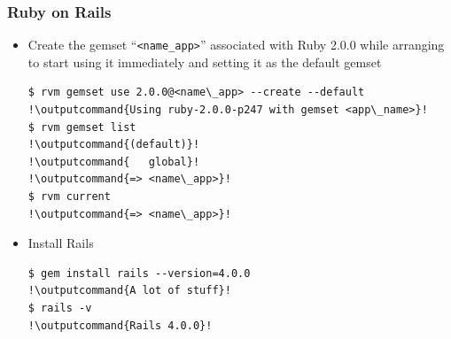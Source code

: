 \documentclass{beamer}
\newcommand{\outputcommand}[1]{\color{darkgreen}{#1}}
\begin{document}
\begin{frame}[fragile]
\frametitle{Ruby on Rails}
\begin{itemize}
\item Create the gemset ``\texttt{<name\_app>}'' associated with Ruby 2.0.0 while arranging to start using it immediately and setting it as the default gemset
\lstset{language=shell, escapechar=!}
\begin{lstlisting}[escapechar=!]
$ rvm gemset use 2.0.0@<name\_app> --create --default
!\outputcommand{Using ruby-2.0.0-p247 with gemset <app\_name>}!
$ rvm gemset list
!\outputcommand{(default)}!
!\outputcommand{   global}!
!\outputcommand{=> <name\_app>}!
$ rvm current
!\outputcommand{=> <name\_app>}!
\end{lstlisting}
\item Install Rails
\begin{lstlisting}[escapechar=!]
$ gem install rails --version=4.0.0
!\outputcommand{A lot of stuff}!
$ rails -v
!\outputcommand{Rails 4.0.0}!
\end{lstlisting}
\end{itemize}
\end{frame}
\end{document}
